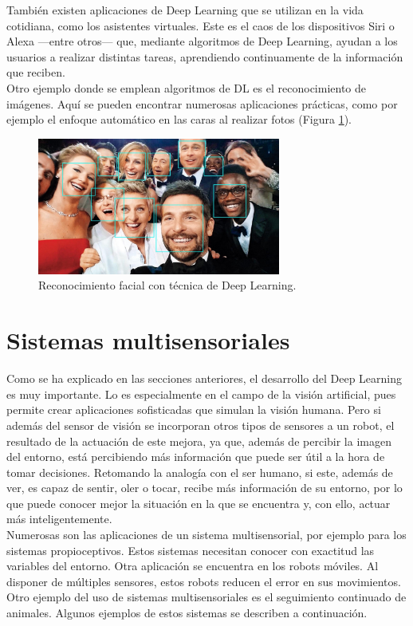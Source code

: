 También existen aplicaciones de Deep Learning que se utilizan en la vida cotidiana, como los asistentes virtuales.  Este es el caos de los dispositivos Siri o Alexa ---entre otros--- que, mediante algoritmos de Deep Learning, ayudan a los usuarios a realizar distintas tareas, aprendiendo continuamente de la información que reciben.\\

Otro ejemplo donde se emplean algoritmos de DL es el reconocimiento de imágenes. Aquí se pueden encontrar numerosas aplicaciones prácticas, como por ejemplo el enfoque automático en las caras al realizar fotos (Figura \ref{fig:caras}).\\
\begin{figure} [h!]
  \begin{center}
    \includegraphics[width=8cm]{figs/caras}
  \end{center}
  \caption{Reconocimiento facial con técnica de Deep Learning.}
  \label{fig:caras}
\end{figure}

\section{Sistemas multisensoriales}
Como se ha explicado en las secciones anteriores, el desarrollo del Deep Learning es muy importante. Lo es especialmente en el campo de la visión artificial, pues permite crear aplicaciones sofisticadas que simulan la visión humana. Pero si además del sensor de visión se incorporan otros tipos de sensores a un robot, el resultado de la actuación de este mejora, ya que, además de percibir la imagen del entorno, está percibiendo más información que puede ser útil a la hora de tomar decisiones. Retomando la analogía con el ser humano, si este, además de ver, es capaz de sentir, oler o tocar, recibe más información de su entorno, por lo que puede conocer mejor la situación en la que se encuentra y, con ello, actuar más inteligentemente.\\

Numerosas son las aplicaciones de un sistema multisensorial, por ejemplo para los sistemas propioceptivos. Estos sistemas necesitan conocer con exactitud las variables del entorno. Otra aplicación se encuentra en los robots móviles. Al disponer de múltiples sensores, estos robots reducen el error en sus movimientos. Otro ejemplo del uso de sistemas multisensoriales es el seguimiento continuado de animales. Algunos ejemplos de estos sistemas se describen a continuación.\\

